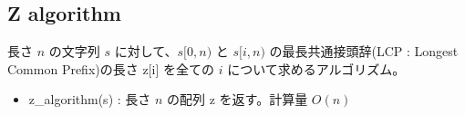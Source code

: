 \subsection{Z algorithm}

長さ $n$ の文字列 $s$ に対して、$s[0,n)$ と $s[i,n)$ の最長共通接頭辞(LCP : Longest Common Prefix)の長さ z[i] を全ての $i$ について求めるアルゴリズム。

\begin{itemize}
    \item z\_algorithm(s) : 長さ $n$ の配列 z を返す。計算量 $O(n)$
\end{itemize}


